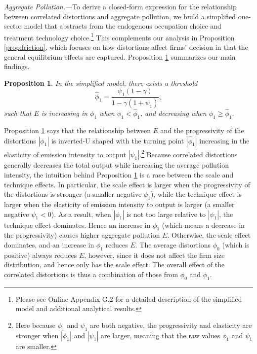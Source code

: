 \documentclass[AEJ]{AEA}
\newtheorem{proposition}{Proposition}
\begin{document}
\textit{Aggregate Pollution.---}To derive a closed-form expression for the relationship between correlated distortions and aggregate pollution, we build a simplified one-sector model that abstracts from the endogenous occupation choice and treatment technology choice.\footnote{Please see Online Appendix G.2 for a detailed description of the simplified model and additional analytical results.} This complements our analysis in Proposition \ref{prop:friction}, which focuses on how distortions affect firms' decision in that the general equilibrium effects are captured. Proposition \ref{prop:agge} summarizes our main findings.
\begin{proposition}
\label{prop:agge}
In the simplified model, there exists a threshold
\begin{equation*}
    \hat{\phi}_1 = \frac{\psi_1(1-\gamma)}{1-\gamma(1+\psi_1)},
\end{equation*}
such that $E$ is increasing in $\phi_1$ when $\phi_1 < \hat{\phi}_1$, and decreasing when $\phi_1 \geq \hat{\phi}_1$.
\end{proposition}

Proposition \ref{prop:agge} says that the relationship between $E$ and the progressivity of the distortions $|\phi_1|$ is inverted-U shaped with the turning point $|\hat{\phi}_1|$ increasing in the elasticity of emission intensity to output $|\psi_1|$.\footnote{Here because $\phi_1$ and $\psi_1$ are both negative, the progressivity and elasticity are stronger when $|\phi_1|$ and $|\psi_1|$ are larger, meaning that the raw values $\phi_1$ and $\psi_1$ are smaller.} Because correlated distortions generally decreases the total output while increasing the average pollution intensity, the intuition behind Proposition \ref{prop:agge} is a race between the scale and technique effects. In particular, the scale effect is larger when the progressivity of the distortions is stronger (a smaller negative $\phi_1$), while the technique effect is larger when the elasticity of emission intensity to output is larger (a smaller negative $\psi_1<0$). As a result, when $|\phi_1|$ is not too large relative to $|\psi_1|$, the technique effect dominates. Hence an increase in $\phi_1$ (which means a decrease in the progressivity) causes higher aggregate pollution $E$. Otherwise, the scale effect dominates, and an increase in $\phi_1$ reduces $E$. The average distortions $\phi_0$ (which is positive) always reduces $E$, however, since it does not affect the firm size distribution, and hence only has the scale effect. The overall effect of the correlated distortions is thus a combination of those from $\phi_0$ and $\phi_1$.
\end{document}
